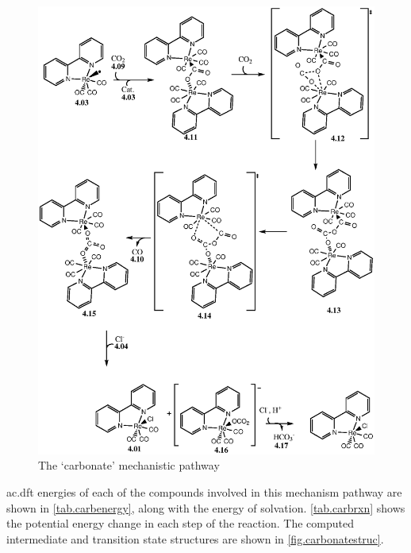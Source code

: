 \begin{figure}[!ht]
 \begin{center}
  \includegraphics[clip=true, width=140mm, keepaspectratio]{images/carbonate.eps}
 \end{center}
\caption{The `carbonate' mechanistic pathway}
\label{fig.carbonate}
\end{figure} 

\Gls{ac.dft} energies of each of the compounds involved in this mechanism pathway are shown in \autoref{tab.carbenergy}, along with the energy of solvation. \autoref{tab.carbrxn} shows the potential energy change in each step of the reaction. The computed intermediate and transition state structures are shown in \autoref{fig.carbonatestruc}.



